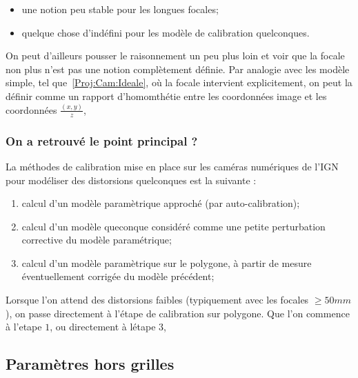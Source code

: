 \begin{itemize}
     \item une notion peu stable pour les longues focales;

    \item quelque chose d'ind\'efini pour les mod\`ele de calibration
          quelconques.
\end{itemize}

On peut d'ailleurs pousser le raisonnement un peu plus loin  et voir que
la focale non plus n'est pas une notion compl\`etement d\'efinie.  Par analogie
avec les mod\`ele simple, tel que~\ref{Proj:Cam:Ideale}, o\`u la focale intervient
explicitement, on peut la d\'efinir comme un rapport d'homomth\'etie entre les
coordonn\'ees image et les coordonn\'ees $\frac{(x,y)}{z}$,
    


\subsubsection{On a retrouv\'e le point principal ?}

La m\'ethodes de calibration mise en place sur les
cam\'eras num\'eriques de l'IGN pour mod\'eliser des distorsions quelconques
est la suivante :

\begin{enumerate}
     \item calcul d'un mod\`ele param\`etrique approch\'e (par auto-calibration);
     \item calcul d'un mod\`ele queconque consid\'er\'e comme une petite 
           perturbation corrective du mod\`ele param\'etrique;
     \item calcul d'un mod\`ele param\`etrique  sur le polygone, \`a partir
           de mesure \'eventuellement corrig\'ee du mod\`ele pr\'ec\'edent;
\end{enumerate}

Lorsque l'on attend des distorsions faibles (typiquement  avec les focales $\geq 50mm$),
on passe directement \`a l'\'etape de calibration sur polygone. Que l'on commence \`a 
l'etape $1$, ou directement \`a l\'etape $3$, 


\subsection{Param\`etres hors grilles}

